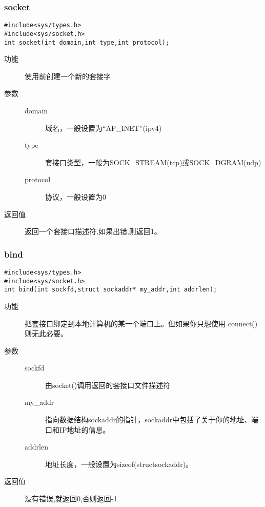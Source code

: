 \subsubsection{socket}
\begin{lstlisting}[style=C]
#include<sys/types.h>
#include<sys/socket.h>
int socket(int domain,int type,int protocol);
\end{lstlisting}
\begin{description}
\item[功能]	使用前创建一个新的套接字
\item[参数]		 
\begin{description}
\item[domain] 域名，一般设置为“AF\_{}INET”(ipv4)
\item[type]	套接口类型，一般为SOCK\_{}STREAM(tcp)或SOCK\_{}DGRAM(udp)
\item[protocol]	协议，一般设置为0
\end{description}
\item[返回值]		返回一个套接口描述符,如果出错,则返回­1。
\end{description}

\subsubsection{bind}
\begin{lstlisting}[style=C]
#include<sys/types.h>
#include<sys/socket.h>
int bind(int sockfd,struct sockaddr* my_addr,int addrlen);
\end{lstlisting}
\begin{description}
\item[功能]	把套接口绑定到本地计算机的某一个端口上。但如果你只想使用
connect()则无此必要。
\item[参数]		 
\begin{description}
\item[sockfd] 	由socket()调用返回的套接口文件描述符
\item[my\_{}addr]	指向数据结构sockaddr的指针，sockaddr中包括了关于你的地址、端口和IP地址的信息。
\item[addrlen]	地址长度，一般设置为sizeof(structsockaddr)。
\end{description}
\item[返回值]		没有错误,就返回0,否则返回-1
\end{description}

